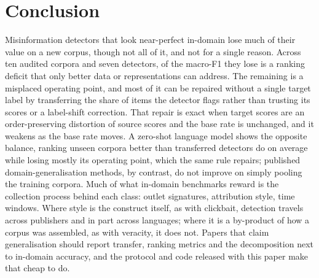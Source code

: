 \section{Conclusion}\label{sec:conclusion}
Misinformation detectors that look near-perfect in-domain lose much of their value on a new corpus, though not all of it, and not for a single reason. Across ten audited corpora and seven detectors, \RankShareAll{} of the macro-F1 they lose is a ranking deficit that only better data or representations can address. The remaining \OpShareAll{} is a misplaced operating point, and most of it can be repaired without a single target label by transferring the share of items the detector flags rather than trusting its scores or a label-shift correction. That repair is exact when target scores are an order-preserving distortion of source scores and the base rate is unchanged, and it weakens as the base rate moves. A zero-shot language model shows the opposite balance, ranking unseen corpora better than transferred detectors do on average while losing mostly its operating point, which the same rule repairs; published domain-generalisation methods, by contrast, do not improve on simply pooling the training corpora. Much of what in-domain benchmarks reward is the collection process behind each class: outlet signatures, attribution style, time windows. Where style is the construct itself, as with clickbait, detection travels across publishers and in part across languages; where it is a by-product of how a corpus was assembled, as with veracity, it does not. Papers that claim generalisation should report transfer, ranking metrics and the decomposition next to in-domain accuracy, and the protocol and code released with this paper make that cheap to do.
